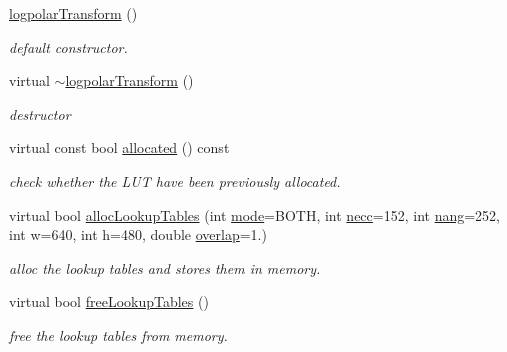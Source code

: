 \begin{DoxyCompactItemize}
\item 
\hyperlink{classiCub_1_1logpolar_1_1logpolarTransform_ab7d0add8a8404a0d2a02e84bd58de37b}{logpolar\+Transform} ()\label{classiCub_1_1logpolar_1_1logpolarTransform_ab7d0add8a8404a0d2a02e84bd58de37b}

\begin{DoxyCompactList}\small\item\em default constructor. \end{DoxyCompactList}\item 
virtual \hyperlink{classiCub_1_1logpolar_1_1logpolarTransform_a5a90b054f53f3670f52dd710025c2a9e}{$\sim$logpolar\+Transform} ()\label{classiCub_1_1logpolar_1_1logpolarTransform_a5a90b054f53f3670f52dd710025c2a9e}

\begin{DoxyCompactList}\small\item\em destructor \end{DoxyCompactList}\item 
virtual const bool \hyperlink{classiCub_1_1logpolar_1_1logpolarTransform_a3afbae8f7933e76fa503f8c5e77caeb3}{allocated} () const 
\begin{DoxyCompactList}\small\item\em check whether the L\+U\+T have been previously allocated. \end{DoxyCompactList}\item 
virtual bool \hyperlink{classiCub_1_1logpolar_1_1logpolarTransform_a7f60edc9c92c3998832f7cb926b52baf}{alloc\+Lookup\+Tables} (int \hyperlink{classiCub_1_1logpolar_1_1logpolarTransform_a5fb489dfcc4689977725ff5ee1cbda64}{mode}=B\+O\+T\+H, int \hyperlink{classiCub_1_1logpolar_1_1logpolarTransform_a2bdd1dc52cc95563fb230f2c3aa83a4a}{necc}=152, int \hyperlink{classiCub_1_1logpolar_1_1logpolarTransform_af4f6a4707db1490c17ef3a118da6b75c}{nang}=252, int w=640, int h=480, double \hyperlink{classiCub_1_1logpolar_1_1logpolarTransform_ac49732902b31db12de79406170faad25}{overlap}=1.)
\begin{DoxyCompactList}\small\item\em alloc the lookup tables and stores them in memory. \end{DoxyCompactList}\item 
virtual bool \hyperlink{classiCub_1_1logpolar_1_1logpolarTransform_ad0d5f20353dc975651b4acc4bef8a62d}{free\+Lookup\+Tables} ()
\begin{DoxyCompactList}\small\item\em free the lookup tables from memory. \end{DoxyCompactList}\item 

\end{DoxyCompactItemize}
